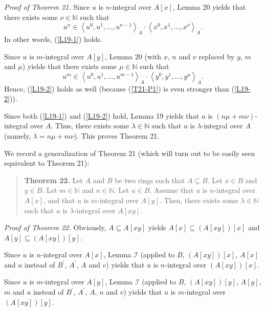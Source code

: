 \documentclass[12pt,final,notitlepage,onecolumn]{article}%
\begin{document}
\textit{Proof of Theorem 21.} Since $u$ is $n$-integral over $A\left[
x\right]  $, Lemma 20 yields that there exists some $\nu\in\mathbb{N}$ such
that%
\[
u^{n}\in\left\langle u^{0},u^{1},...,u^{n-1}\right\rangle _{A}\cdot
\left\langle x^{0},x^{1},...,x^{\nu}\right\rangle _{A}.
\]
In other words, (\ref{L19-1}) holds.

Since $u$ is $m$-integral over $A\left[  y\right]  $, Lemma 20 (with $x$, $n$
and $\nu$ replaced by $y$, $m$ and $\mu$) yields that there exists some
$\mu\in\mathbb{N}$ such that%
\begin{equation}
u^{m}\in\left\langle u^{0},u^{1},...,u^{m-1}\right\rangle _{A}\cdot
\left\langle y^{0},y^{1},...,y^{\mu}\right\rangle _{A}. \label{T21-P1}%
\end{equation}
Hence, (\ref{L19-2}) holds as well (because (\ref{T21-P1}) is even stronger
than (\ref{L19-2})).

Since both (\ref{L19-1}) and (\ref{L19-2}) hold, Lemma 19 yields that $u$ is
$\left(  n\mu+m\nu\right)  $-integral over $A$. Thus, there exists some
$\lambda\in\mathbb{N}$ such that $u$ is $\lambda$-integral over $A$ (namely,
$\lambda=n\mu+m\nu$). This proves Theorem 21.

We record a generalization of Theorem 21 (which will turn out to be easily
seen equivalent to Theorem 21):

\begin{quote}
\textbf{Theorem 22.} Let $A$ and $B$ be two rings such that $A\subseteq B$.
Let $x\in B$ and $y\in B$. Let $m\in\mathbb{N}$ and $n\in\mathbb{N}$. Let
$u\in B$. Assume that $u$ is $n$-integral over $A\left[  x\right]  $, and that
$u$ is $m$-integral over $A\left[  y\right]  $. Then, there exists some
$\lambda\in\mathbb{N}$ such that $u$ is $\lambda$-integral over $A\left[
xy\right]  $.
\end{quote}

\textit{Proof of Theorem 22.} Obviously, $A\subseteq A\left[  xy\right]  $
yields $A\left[  x\right]  \subseteq\left(  A\left[  xy\right]  \right)
\left[  x\right]  $ and $A\left[  y\right]  \subseteq\left(  A\left[
xy\right]  \right)  \left[  y\right]  $.

Since $u$ is $n$-integral over $A\left[  x\right]  $, Lemma $\mathcal{I}$
(applied to $B$, $\left(  A\left[  xy\right]  \right)  \left[  x\right]  $,
$A\left[  x\right]  $ and $u$ instead of $B^{\prime}$, $A^{\prime}$, $A$ and
$v$) yields that $u$ is $n$-integral over $\left(  A\left[  xy\right]
\right)  \left[  x\right]  $.

Since $u$ is $m$-integral over $A\left[  y\right]  $, Lemma $\mathcal{I}$
(applied to $B$, $\left(  A\left[  xy\right]  \right)  \left[  y\right]  $,
$A\left[  y\right]  $, $m$ and $u$ instead of $B^{\prime}$, $A^{\prime}$, $A$,
$n$ and $v$) yields that $u$ is $m$-integral over $\left(  A\left[  xy\right]
\right)  \left[  y\right]  $.
\end{document}
